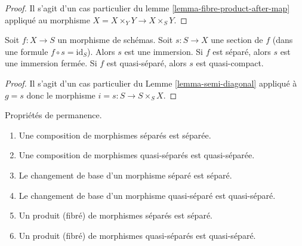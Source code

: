 \begin{proof}
Il s'agit d'un cas particulier du lemme  \ref{lemma-fibre-product-after-map}  appliqué au morphisme
 $X = X \times_Y Y \to X \times_S Y$.
\end{proof}

\begin{lemma}
\label{lemma-section-immersion}
Soit  $f : X \to S$  un morphisme de schémas. Soit  $s : S \to X$  une section de
 $f$  (dans une formule  $f \circ s = \text{id}_S$). Alors  $s$  est une
immersion. Si  $f$  est séparé, alors  $s$  est une immersion
fermée. Si  $f$  est quasi-séparé, alors  $s$  est quasi-compact.
\end{lemma}

\begin{proof}
Il s'agit d'un cas particulier du Lemme  \ref{lemma-semi-diagonal}  appliqué à  $g =s$  donc
le morphisme  $i = s : S \to S \times_S X$.
\end{proof}

\begin{lemma}
\label{lemma-separated-permanence}
Propriétés de permanence.
\begin{enumerate}
\item Une composition de morphismes séparés est séparée.
\item Une composition de morphismes quasi-séparés est quasi-séparée.
\item Le changement de base d'un morphisme séparé est séparé.
\item Le changement de base d'un morphisme quasi-séparé est quasi-séparé.
\item Un produit (fibré) de morphismes séparés est séparé.
\item Un produit (fibré) de morphismes quasi-séparés est quasi-séparé.
\end{enumerate}
\end{lemma}

